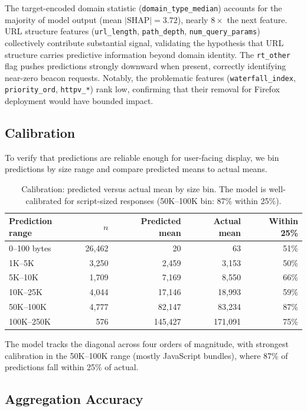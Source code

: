 \documentclass[11pt]{article}
\begin{document}
The target-encoded domain statistic (\texttt{domain\_type\_median}) accounts for the majority of model output (mean $|\text{SHAP}| = 3.72$), nearly $8\times$ the next feature. URL structure features (\texttt{url\_length}, \texttt{path\_depth}, \texttt{num\_query\_params}) collectively contribute substantial signal, validating the hypothesis that URL structure carries predictive information beyond domain identity. The \texttt{rt\_other} flag pushes predictions strongly downward when present, correctly identifying near-zero beacon requests. Notably, the problematic features (\texttt{waterfall\_index}, \texttt{priority\_ord}, \texttt{httpv\_*}) rank low, confirming that their removal for Firefox deployment would have bounded impact.

\subsection{Calibration}

To verify that predictions are reliable enough for user-facing display, we bin predictions by size range and compare predicted means to actual means.

\begin{table}[h]
\centering
\small
\begin{tabular}{lrrrr}
\toprule
Prediction range & $n$ & Predicted mean & Actual mean & Within 25\% \\
\midrule
0--100 bytes & 26,462 & 20 & 63 & 51\% \\
1K--5K & 3,250 & 2,459 & 3,153 & 50\% \\
5K--10K & 1,709 & 7,169 & 8,550 & 66\% \\
10K--25K & 4,044 & 17,146 & 18,993 & 59\% \\
50K--100K & 4,777 & 82,147 & 83,234 & 87\% \\
100K--250K & 576 & 145,427 & 171,091 & 75\% \\
\bottomrule
\end{tabular}
\caption{Calibration: predicted versus actual mean by size bin. The model is well-calibrated for script-sized responses (50K--100K bin: 87\% within 25\%).}
\label{tab:calibration}
\end{table}

The model tracks the diagonal across four orders of magnitude, with strongest calibration in the 50K--100K range (mostly JavaScript bundles), where 87\% of predictions fall within 25\% of actual.

\subsection{Aggregation Accuracy}
\label{sec:aggregation}
\end{document}
